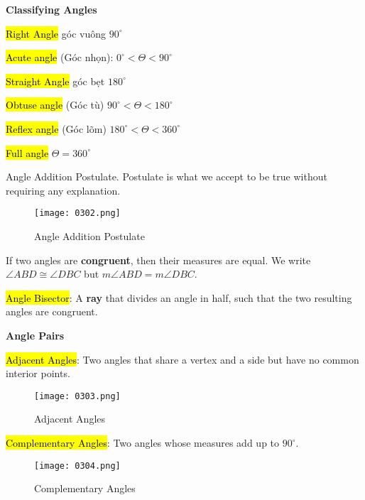 \vspace{1 cm}

\centerline{\textbf{\huge Classifying Angles}}

\vspace{0.2 cm}

\hl{Right Angle} góc vuông $90^{\circ}$

\hl{Acute angle} (Góc nhọn): $0^{\circ} < \Theta < 90^{\circ}$

\hl{Straight Angle} góc bẹt $180^{\circ}$

\hl{Obtuse angle} (Góc tù) $90^{\circ} < \Theta < 180^{\circ}$

\hl{Reflex angle} (Góc lõm) $180^{\circ} < \Theta < 360^{\circ}$

\hl{Full angle} $\Theta = 360^{\circ}$

\newpage

Angle Addition Postulate. Postulate is what we accept to be true without requiring any explanation.

\begin{figure}[htb!]
  \centering
  \texttt{[image: 0302.png]}
  \caption{Angle Addition Postulate}
\end{figure}

If two angles are \textbf{congruent}, then their measures are equal. We write $\angle ABD \cong \angle DBC$ but $m\angle ABD = m\angle DBC$.

\hl{Angle Bisector}: A \textbf{ray} that divides an angle in half, such that the two resulting angles are congruent.

\vspace{0.9 cm}

\centerline{\textbf{\huge Angle Pairs}}

\vspace{0.2 cm}

\hl{Adjacent Angles}: Two angles that share a vertex and a side but have no common interior points.

\begin{figure}[htb!]
  \centering
  \texttt{[image: 0303.png]}
  \caption{Adjacent Angles}
\end{figure}

\newpage

\hl{Complementary Angles}: Two angles whose measures add up to $90^{\circ}$.

\begin{figure}[htb!]
  \centering
  \texttt{[image: 0304.png]}
  \caption{Complementary Angles}
\end{figure}

